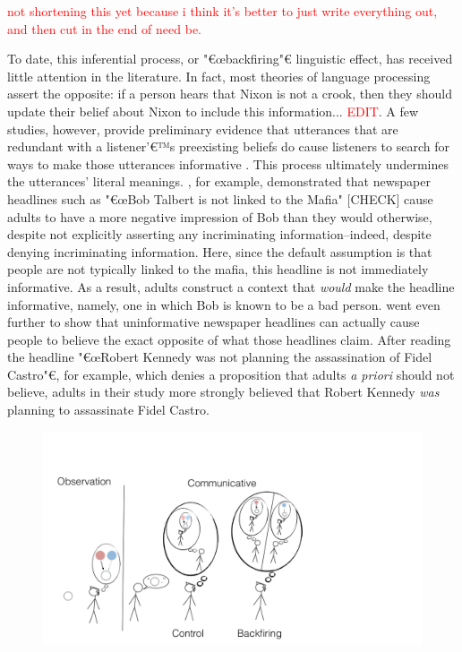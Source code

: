 \documentclass[10pt,letterpaper]{article}
\newcommand{\red}[1]{\textcolor{Red}{#1}}
\begin{document}
\red{not shortening this yet because i think it's better to just write everything out, and then cut in the end of need be.}

To date, this inferential process, or "€œbackfiring"€ linguistic effect, has received little attention in the literature.  In fact, most theories of language processing assert the opposite: if a person hears that Nixon is not a crook, then they should update their belief about Nixon to include this information... \red{EDIT}.  A few studies, however, provide preliminary evidence that utterances that are redundant with a listener'€™s preexisting beliefs do cause listeners to search for ways to make those utterances informative \cite{Yandell1979, Wegner1981, Gruenfeld1992, Kravtchenko2015}.  This process ultimately undermines the utterances' literal meanings.  
, for example, demonstrated that newspaper headlines such as "€œBob Talbert is not linked to the Mafia" [CHECK] cause adults to have a more negative impression of Bob than they would otherwise, despite not explicitly asserting any incriminating information--indeed, despite denying incriminating information.  Here, since the default assumption is that people are not typically linked to the mafia, this headline is not immediately informative.  As a result, adults construct a context that \emph{would} make the headline informative, namely, one in which Bob is known to be a bad person.  
 went even further to show that uninformative newspaper headlines can actually cause people to believe the exact opposite of what those headlines claim.  After reading the headline "€œRobert Kennedy was not planning the assassination of Fidel Castro"€, for example, which denies a proposition that adults \emph{a priori} should not believe, adults in their study more strongly believed that Robert Kennedy \emph{was} planning to assassinate Fidel Castro.


\begin{figure}
\centering
    \includegraphics[width=\columnwidth]{cartoon}
    \caption{}
  \label{fig:cartoon}
\end{figure}
\end{document}
